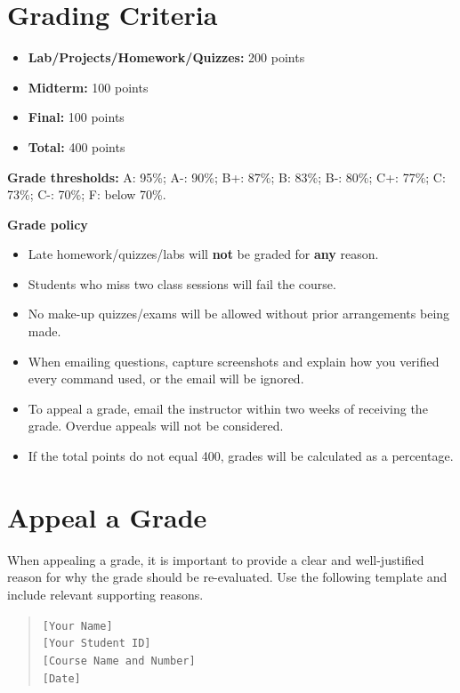 \documentclass[10pt]{article}
\begin{document}
\section{Grading Criteria}
\begin{itemize}[label={},leftmargin=0pt,itemsep=0.1em]
  \item \textbf{Lab/Projects/Homework/Quizzes:} 200 points
  \item \textbf{Midterm:} 100 points
  \item \textbf{Final:} 100 points
  \item \textbf{Total:} 400 points
\end{itemize}

\textbf{Grade thresholds:} A: 95\%; A-: 90\%; B+: 87\%; B: 83\%; B-: 80\%; C+: 77\%; C: 73\%; C-: 70\%; F: below 70\%.

\begin{policybox}
  \textbf{Grade policy}
  \begin{itemize}
    \item Late homework/quizzes/labs will \textbf{not} be graded for \textbf{any} reason.
    \item Students who miss two class sessions will fail the course.
    \item No make-up quizzes/exams will be allowed without prior arrangements being made.
    \item When emailing questions, capture screenshots and explain how you verified every command used, or the email will be ignored.
    \item To appeal a grade, email the instructor within two weeks of receiving the grade. Overdue appeals will not be considered.
    \item If the total points do not equal 400, grades will be calculated as a percentage.
  \end{itemize}
\end{policybox}

\section{Appeal a Grade}
When appealing a grade, it is important to provide a clear and well-justified reason for why the grade should be re-evaluated. Use the following template and include relevant supporting reasons.

\begin{quote}
  \texttt{[Your Name]}\\
  \texttt{[Your Student ID]}\\
  \texttt{[Course Name and Number]}\\
  \texttt{[Date]}
\end{quote}
\end{document}
